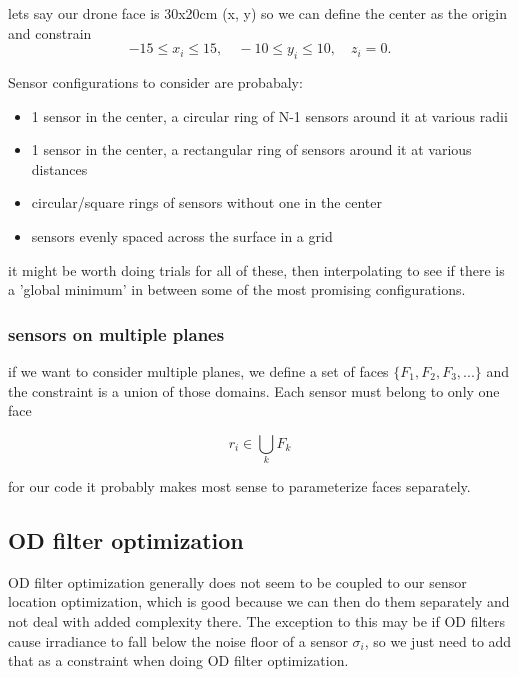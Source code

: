 \documentclass[12pt]{article}
\begin{document}
lets say our drone face is 30x20cm (x, y) so we can define the center as the origin and constrain 
\begin{equation}
-15 \leq x_i \leq 15, \quad -10 \leq y_i \leq 10, \quad  z_i=0.
\end{equation}

Sensor configurations to consider are probabaly:
\begin{itemize}
    \item 1 sensor in the center, a circular ring of N-1 sensors around it at various radii
    \item 1 sensor in the center, a rectangular ring of sensors around it at various distances
    \item circular/square rings of sensors without one in the center
    \item sensors evenly spaced across the surface in a grid
\end{itemize}

it might be worth doing trials for all of these, then interpolating to see if there is a 'global minimum' in between some of the most promising configurations.

\subsubsection{sensors on multiple planes}

if we want to consider multiple planes, we define a set of faces $\{F_1, F_2, F_3, ...\}$ and the constraint is a union of those domains. Each sensor must belong to only one face

\begin{equation}
    r_i \in \bigcup_k F_k
\end{equation}

for our code it probably makes most sense to parameterize faces separately.



\subsection{OD filter optimization}

OD filter optimization generally does not seem to be coupled to our sensor location optimization, which is good because we can then do them separately and not deal with added complexity there. The exception to this may be if OD filters cause irradiance to fall below the noise floor of a sensor $\sigma_i$, so we just need to add that as a constraint when doing OD filter optimization.
\end{document}
